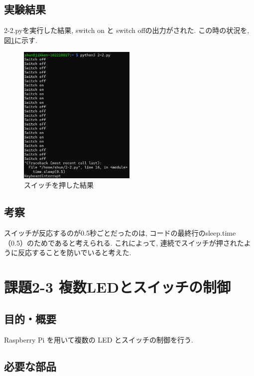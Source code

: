 \documentclass{ltjsarticle} %
\begin{document}
\subsection{実験結果}

2-2.pyを実行した結果, switch on と switch offの出力がされた.
この時の状況を, 図\ref{fig:result2-2}に示す.

\begin{figure}[H] %
  \centering
  \includegraphics[width=0.5\textwidth]{result2-2.png} %
  \caption{スイッチを押した結果} %
  \label{fig:result2-2} %
\end{figure}

\subsection{考察}
スイッチが反応するのが0.5秒ごとだったのは, コードの最終行のsleep.time（0.5）のためであると考えられる. 
これによって, 連続でスイッチが押されたように反応することを防いでいると考えた. 


\section{課題2-3 複数LEDとスイッチの制御}

\subsection{目的・概要}
Raspberry Pi を⽤いて複数の LED とスイッチの制御を⾏う. 

\subsection{必要な部品}
\end{document}
